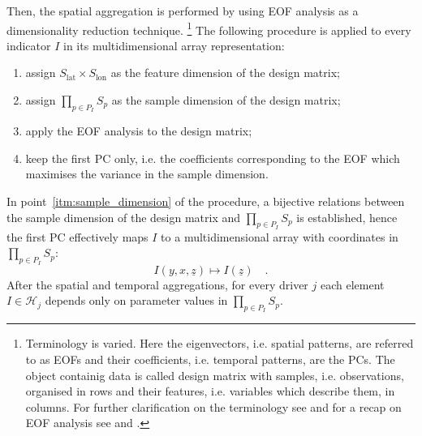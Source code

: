 Then, the spatial aggregation is performed by using \gls{EOF} analysis as a dimensionality reduction technique.%
\footnote{Terminology is varied. Here the eigenvectors, i.e. spatial patterns, are referred to as \glspl{EOF} and their coefficients, i.e. temporal patterns, are the \glspl{PC}. The object containig data is called design matrix with samples, i.e. observations, organised in rows and their features, i.e. variables which describe them, in columns. For further clarification on the terminology see \cite[626-627]{2019WilksStatisticalMethods} and for a recap on \gls{EOF} analysis see \cite[6502-6503]{2009MonahanEmpiricalOrthogonal} and \cite[1121-1122]{2007HannachiEmpiricalOrthogonal}.}
The following procedure is applied to every \gls{indicator} $I$ in its multidimensional array representation:
\begin{enumerate}
  \item assign $S_\text{lat} \times S_\text{lon}$ as the feature dimension of the design matrix;
  \item \label{itm:sample_dimension} assign $\prod_{p \in P_I} S_p$ as the sample dimension of the design matrix;
  \item apply the \gls{EOF} analysis to the design matrix;
  \item keep the first \gls{PC} only, i.e. the coefficients corresponding to the \gls{EOF} which maximises the variance in the sample dimension.
\end{enumerate}
In point~\ref{itm:sample_dimension} of the procedure, a bijective relations between the sample dimension of the design matrix and $\prod_{p \in P_I} S_p$ is established, hence the first \gls{PC} effectively maps $I$ to a multidimensional array with coordinates in $\prod_{p \in P_I} S_p$:
\begin{equation}
  \label{eq:spatial_aggregation}
  I(y, x, \underline{z}) \mapsto I(\underline{z})%
  \quad .
\end{equation}
After the spatial and temporal aggregations, for every \gls{driver} $j$ each element $I \in \mathcal{H}_j$ depends only on parameter values in $\prod_{p \in P_I} S_p$.


